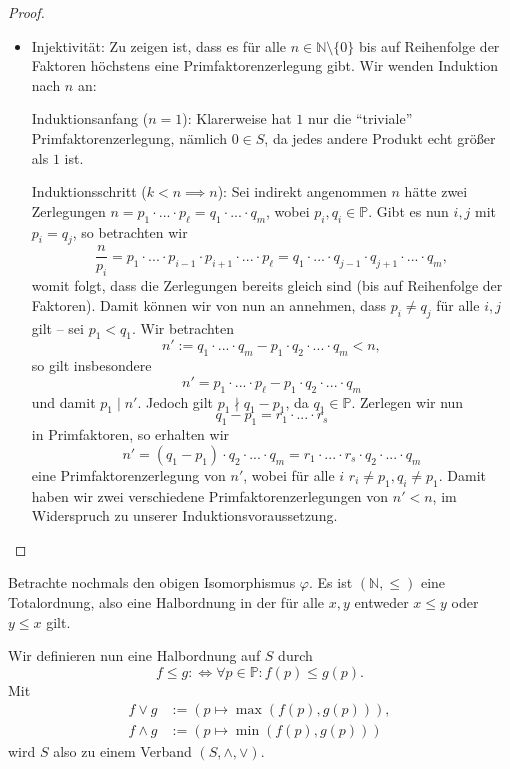 \begin{proof}
\begin{itemize}
        \item Injektivität: Zu zeigen ist, dass es für alle $n \in \mathbb{N} \setminus \{0\}$ bis auf Reihenfolge der Faktoren höchstens eine Primfaktorenzerlegung gibt. Wir wenden Induktion nach $n$ an:
        
        Induktionsanfang ($n=1$): Klarerweise hat $1$ nur die ``triviale'' Primfaktorenzerlegung, nämlich $0 \in S$, da jedes andere Produkt echt größer als $1$ ist.

        Induktionsschritt ($k<n \implies n$): Sei indirekt angenommen $n$ hätte zwei Zerlegungen $n = p_1 \cdot ... \cdot p_\ell = q_1 \cdot ... \cdot q_m$, wobei $p_i, q_i \in \mathbb{P}$. Gibt es nun $i,j$ mit $p_i = q_j$, so betrachten wir
        $$ \frac{n}{p_i} = p_1 \cdot ... \cdot p_{i-1} \cdot p_{i+1} \cdot ... \cdot p_\ell = q_1 \cdot ... \cdot q_{j-1} \cdot q_{j+1} \cdot ... \cdot q_m, $$
        womit folgt, dass die Zerlegungen bereits gleich sind (bis auf Reihenfolge der Faktoren). Damit können wir von nun an annehmen, dass $p_i \neq q_j$ für alle $i, j$ gilt -- \obda sei $p_1 < q_1$. Wir betrachten
        $$ n' := q_1 \cdot ... \cdot q_m - p_1 \cdot q_2 \cdot ... \cdot q_m < n, $$
        so gilt insbesondere
        $$ n' = p_1 \cdot ... \cdot p_\ell - p_1 \cdot q_2 \cdot ... \cdot q_m $$
        und damit $p_1 \mid n'$. Jedoch gilt $p_1 \nmid q_1 - p_1$, da $q_1 \in \mathbb{P}$. Zerlegen wir nun
        $$ q_1 - p_1 = r_1 \cdot ... \cdot r_s $$
        in Primfaktoren, so erhalten wir
        $$ n' = (q_1 - p_1) \cdot q_2 \cdot ... \cdot q_m = r_1 \cdot ... \cdot r_s \cdot q_2 \cdot ... \cdot q_m $$
        eine Primfaktorenzerlegung von $n'$, wobei für alle $i$ $r_i \neq p_1, q_i \neq p_1$. Damit haben wir zwei verschiedene Primfaktorenzerlegungen von $n' < n$, im Widerspruch zu unserer Induktionsvoraussetzung.
    \end{itemize}
\end{proof}

\begin{remark}
    Betrachte nochmals den obigen Isomorphismus $\varphi$. Es ist $(\mathbb{N}, \leq)$ eine Totalordnung, also eine Halbordnung in der für alle $x,y$ entweder $x \leq y$ oder $y \leq x$ gilt.

    Wir definieren nun eine Halbordnung auf $S$ durch
    $$ f \leq g :\Leftrightarrow \forall p \in \mathbb{P}: f(p) \leq g(p). $$
    Mit 
    \begin{align*}
        f \vee g &:= (p \mapsto \max(f(p),g(p))), \\ f \wedge g &:= (p \mapsto \min(f(p),g(p)))
    \end{align*}
    wird $S$ also zu einem Verband $(S, \land, \lor)$.
\end{remark}

